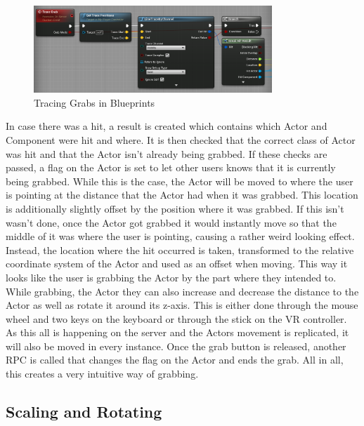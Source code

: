 \begin{figure}[htpb]
	\centering
	\includegraphics[width=0.8\textwidth]{fig/LineTracing2.png}
	\caption[Tracing Grabs in Blueprints]{Tracing Grabs in Blueprints\protect}
	\label{fig:LineTracing}
\end{figure}

In case there was a hit, a result is created which contains which Actor and Component were hit and where. It is then checked that the correct class of Actor was hit and that the Actor isn't already being grabbed. If these checks are passed, a flag on the Actor is set to let other users knows that it is currently being grabbed. While this is the case, the Actor will be moved to where the user is pointing at the distance that the Actor had when it was grabbed. This location is additionally slightly offset by the position where it was grabbed. If this isn't wasn't done, once the Actor got grabbed it would instantly move so that the middle of it was where the user is pointing, causing a rather weird looking effect. Instead, the location where the hit occurred is taken, transformed to the relative coordinate system of the Actor and used as an offset when moving. This way it looks like the user is grabbing the Actor by the part where they intended to. While grabbing, the Actor they can also increase and decrease the distance to the Actor as well as rotate it around its z-axis. This is either done through the mouse wheel and two keys on the keyboard or through the stick on the VR controller. As this all is happening on the server and the Actors movement is replicated, it will also be moved in every instance. Once the grab button is released, another \acs{RPC} is called that changes the flag on the Actor and ends the grab. All in all, this creates a very intuitive way of grabbing.

\subsection{Scaling and Rotating}

